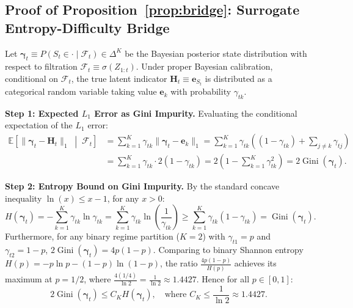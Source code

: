 \documentclass[twoside]{article}
\theoremstyle{definition}
\newcommand{\E}{\mathbb{E}}
\begin{document}
\subsection{Proof of Proposition~\ref{prop:bridge}: Surrogate Entropy-Difficulty Bridge}
\label{app:proof_bridge}
Let $\boldsymbol{\gamma}_t \equiv P(S_t \in \cdot \mid \mathcal{F}_t) \in \Delta^K$ be the Bayesian posterior state distribution with respect to filtration $\mathcal{F}_t \equiv \sigma(Z_{1:t})$. Under proper Bayesian calibration, conditional on $\mathcal{F}_t$, the true latent indicator $\boldsymbol{H}_t \equiv \boldsymbol{e}_{S_t}$ is distributed as a categorical random variable taking value $\boldsymbol{e}_k$ with probability $\gamma_{tk}$.

\textbf{Step 1: Expected $L_1$ Error as Gini Impurity.}
Evaluating the conditional expectation of the $L_1$ error:
\begin{align}
    \E\left[ \|\boldsymbol{\gamma}_t - \boldsymbol{H}_t\|_1 \;\middle|\; \mathcal{F}_t \right] &= \sum_{k=1}^K \gamma_{tk} \|\boldsymbol{\gamma}_t - \boldsymbol{e}_k\|_1 = \sum_{k=1}^K \gamma_{tk} \left( (1 - \gamma_{tk}) + \sum_{j \neq k} \gamma_{tj} \right) \nonumber \\
    &= \sum_{k=1}^K \gamma_{tk} \cdot 2(1 - \gamma_{tk}) = 2\left( 1 - \sum_{k=1}^K \gamma_{tk}^2 \right) = 2 \operatorname{Gini}(\boldsymbol{\gamma}_t).
\end{align}

\textbf{Step 2: Entropy Bound on Gini Impurity.}
By the standard concave inequality $\ln(x) \le x - 1$, for any $x > 0$:
\begin{equation}
    H(\boldsymbol{\gamma}_t) = -\sum_{k=1}^K \gamma_{tk} \ln \gamma_{tk} = \sum_{k=1}^K \gamma_{tk} \ln\left(\frac{1}{\gamma_{tk}}\right) \ge \sum_{k=1}^K \gamma_{tk} (1 - \gamma_{tk}) = \operatorname{Gini}(\boldsymbol{\gamma}_t).
\end{equation}
Furthermore, for any binary regime partition ($K=2$) with $\gamma_{t1} = p$ and $\gamma_{t2} = 1-p$, $2 \operatorname{Gini}(\boldsymbol{\gamma}_t) = 4p(1-p)$. Comparing to binary Shannon entropy $H(p) = -p\ln p - (1-p)\ln(1-p)$, the ratio $\frac{4p(1-p)}{H(p)}$ achieves its maximum at $p = 1/2$, where $\frac{4(1/4)}{\ln 2} = \frac{1}{\ln 2} \approx 1.4427$. Hence for all $p \in [0, 1]$:
\begin{equation}
    2 \operatorname{Gini}(\boldsymbol{\gamma}_t) \le C_K H(\boldsymbol{\gamma}_t), \quad \text{where } C_K \le \frac{1}{\ln 2} \approx 1.4427.
\end{equation}
\end{document}
